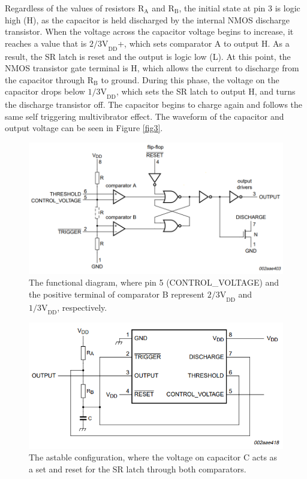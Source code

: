 \documentclass[10pt,twocolumn]{article}
\begin{document}
Regardless of the values of resistors ${\mbox{R}}_{\mbox{A}}$ and ${\mbox{R}}_{\mbox{B}}$, the initial state at pin 3 is logic high (H), as the capacitor is held discharged by the internal NMOS discharge transistor. When the voltage across the capacitor voltage begins to increase, it reaches a value that is ${\mbox{2/3V}}_{\mbox{DD}}$+, which sets comparator A to output H. As a result, the SR latch is reset and the output is logic low (L). At this point, the NMOS transistor gate terminal is H, which allows the current to discharge from the capacitor through ${\mbox{R}}_{\mbox{B}}$ to ground. During this phase, the voltage on the capacitor drops below ${\mbox{1/3V}}_{\mbox{DD}}$, which sets the SR latch to output H, and turns the discharge transistor off. The capacitor begins to charge again and follows the same self triggering multivibrator effect. The waveform of the capacitor and output voltage can be seen in Figure \ref{fig3}.

\begin{figure}[H]
	\includegraphics[width=1\linewidth]{images/ICM7555-functional-diagram.png}
	\caption{The functional diagram, where pin 5 (CONTROL\_VOLTAGE) and the positive terminal of comparator B represent ${\mbox{2/3V}}_{\mbox{DD}}$ and ${\mbox{1/3V}}_{\mbox{DD}}$, respectively.}
	\label{fig1}
\end{figure}
\begin{figure}[H]
	\includegraphics[width=1\linewidth]{images/ICM7555-astable-config.png}
	\caption{The astable configuration, where the voltage on capacitor C acts as a set and reset for the SR latch through both comparators.}
	\label{fig2}
\end{figure}
\end{document}
